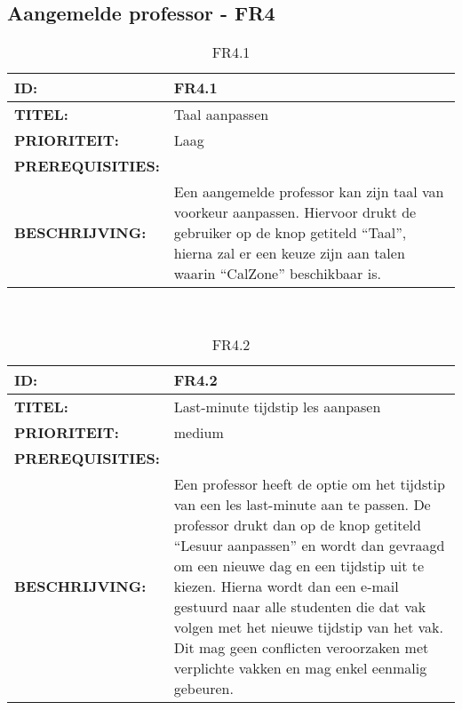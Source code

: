 \subsection{Aangemelde professor - FR4}

\noindent\begin{table}[h]
            \begin{tabular}{l | p{10cm}}
                \textbf{ID:} & FR4.1 \\ \hline
                \textbf{TITEL:} & Taal aanpassen\\ \hline
                \textbf{PRIORITEIT:} &  Laag \\ \hline
                \textbf{PREREQUISITIES:} & \\ \hline
                \textbf{BESCHRIJVING:} & Een aangemelde professor kan zijn taal van voorkeur aanpassen. 
                                        Hiervoor drukt de gebruiker op de knop getiteld “Taal”, hierna zal er een keuze zijn aan talen waarin “CalZone” beschikbaar is.\\ 
            \end{tabular}\\
            \caption{FR4.1}
            \label{tab:FR4.1}
        \end{table}
        
\noindent\begin{table}[h]
            \begin{tabular}{l | p{10cm}}
                \textbf{ID:} & FR4.2 \\ \hline
                \textbf{TITEL:} & Last-minute tijdstip les aanpasen\\ \hline
                \textbf{PRIORITEIT:} &  medium \\ \hline
                \textbf{PREREQUISITIES:} & \\ \hline
                \textbf{BESCHRIJVING:} & Een professor heeft de optie om het tijdstip van een les last-minute aan te passen. De professor drukt dan op de knop getiteld “Lesuur aanpassen” en wordt dan gevraagd om een nieuwe dag en een tijdstip uit te kiezen. Hierna wordt dan een e-mail gestuurd naar alle studenten die dat vak volgen met het nieuwe tijdstip van het vak. Dit mag geen conflicten veroorzaken met verplichte vakken en mag enkel eenmalig gebeuren. \\ 
            \end{tabular}\\
            \caption{FR4.2}
            \label{tab:FR4.2}
        \end{table}
        
